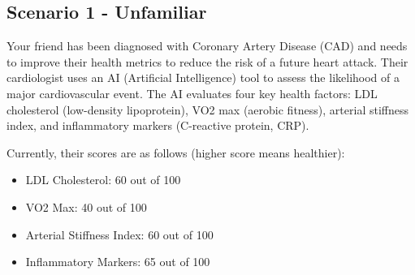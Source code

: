 
\subsection{Scenario 1 - Unfamiliar}
Your friend has been diagnosed with Coronary Artery Disease (CAD) and needs to improve their health metrics to reduce the risk of a future heart attack. Their cardiologist uses an AI (Artificial Intelligence) tool to assess the likelihood of a major cardiovascular event. The AI evaluates four key health factors: LDL cholesterol (low-density lipoprotein), VO2 max (aerobic fitness), arterial stiffness index, and inflammatory markers (C-reactive protein, CRP).

Currently, their scores are as follows (higher score means healthier):
\begin{itemize}
    \item LDL Cholesterol: 60 out of 100
    \item VO2 Max: 40 out of 100
    \item Arterial Stiffness Index: 60 out of 100
    \item Inflammatory Markers: 65 out of 100
\end{itemize}

